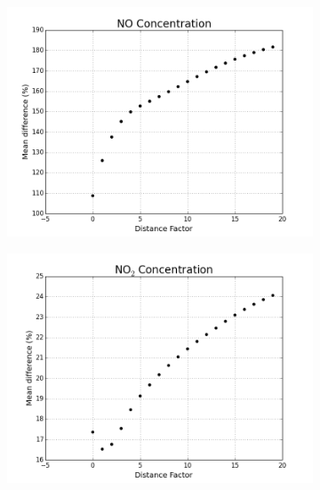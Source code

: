 			\begin{figure}
                \centering
                \begin{subfigure}{0.5\textwidth}
                    \centering
                    \includegraphics[width=\linewidth]{./images/IDW_P_NO.png}
                    \caption{}
                    \label{fig:idw_power_NO}
                \end{subfigure}%
                \begin{subfigure}{0.5\textwidth}
                    \includegraphics[width=\linewidth]{./images/IDW_P_NO2.png}
                    \caption{}
                    \label{fig:idw_power_NO2}
                \end{subfigure}

\end{figure}
